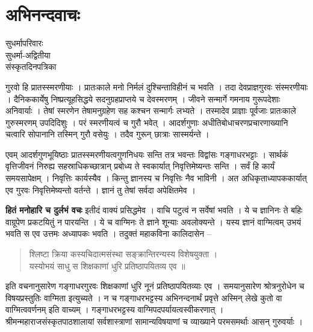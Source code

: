 \chapter{अभिनन्दवाचः}

\begin{center}
\smallskip
सुधर्मापरिवारः\\
सुधर्मा-अद्वितीया\\ 
संस्कृतदिनपत्रिका
\addrule
\end{center}

गुरवो हि प्रातस्स्मरणीयाः । प्रातःकाले मनो निर्मलं दुश्चिन्ताविहीनं च भवति । तदा देवप्राज्ञगुरवः संस्मरणीयाः । दैनिककार्येषु निष्प्रत्यूहसिद्धये सदनुग्रहप्राप्तये च देवस्मरणम् । जीवने सन्मार्गे गमनाय गुरूपदेशाः अनिवार्याः । तेषां स्मरणेन तेषामनुग्रहेण सह कश्चन सन्मार्गः लभ्यते । तस्मादेव प्राज्ञाः पूर्वजाः प्रातःकाले गुरुस्मरणम् उपदिदिशुः । परं स्मरणीयत्वं च गुरौ भवेत् । आदर्शगुणाः अधीतिबोधाचरणप्रचारणाख्यानि चत्वारि सोपानानि तस्मिन् गुरौ वसेयुः । तदैव गुरून् छात्राः सास्मर्यन्ते । 

एवम् आदर्शगुणभूयिष्ठाः प्रातस्स्मरणीयत्वगुणनिधयः सन्ति तत्र भवन्तः विद्वांसः गङ्गाधरभट्टाः । सार्थकं वृत्तिजीवनं निरुह्य सहस्राधिकच्छात्रान् प्रबोध्य ते स्वकार्यात् निवृत्तिमेष्यन्तः सन्ति । सर्वं हि कार्यं समयसापेक्षम् । निवृत्तिः कार्यस्यैव । किन्तु ज्ञानस्य च निवृत्तिः नैव भाविनी । अत अधिकृताध्यापककार्यात् एव गुरवः निवृत्तिमेष्यन्तो वर्तन्ते । ज्ञानं तु तेषां सर्वदा अपेक्षितमेव ।

\textbf{हितं मनोहारि च दुर्लभं वचः} इतीदं वाक्यं प्रसिद्धमेव । वाचि पटुत्वं न सर्वेषां भवति । ये च ज्ञानिनः ते बहिः वाग्रूपेण प्रकटयितुं न पारयन्ति । ये च वाग्मिनः ते ज्ञाने शून्याः अवलोक्यन्ते । यस्य ज्ञानं वाग्मित्वम् उभयं भवति स एव उत्तमः अध्यापकः भवति । तदुक्तं महाकविना कालिदासेन --

\begin{verse}
श्लिष्टा क्रिया कस्यचिदात्मसंस्था सङ्क्रान्तिरन्यस्य विशेषयुक्ता ।\\
यस्योभयं साधु स शिक्षकाणां धुरि प्रतिष्ठापयितव्य एव ॥
\end{verse}

इति वचनानुसारेण गङ्गाधरगुरवः शिक्षकाणां धुरि नूनं प्रतिष्ठापयितव्याः एव । समयानुसारेण श्रोत्रनुरोधेन च विषयप्रस्तुतिः वाग्मिता इत्युच्यते । न च गङ्गाधरभट्टस्य अभिनन्दनार्थं प्रवृत्ते अस्मिन् लेखे कुतो वा वाग्मित्ववर्णनम् इति वाच्यम् । गङ्गाधरभट्टस्य वाग्मिपदपर्यायत्वस्वीकरणात् । श्रीमन्महाराजसंस्कृतपाठशालायां सर्वशास्त्राणां सामान्यविषयाणां च व्याख्याने परमसमर्थाः आसन् गुरुवर्याः । 

